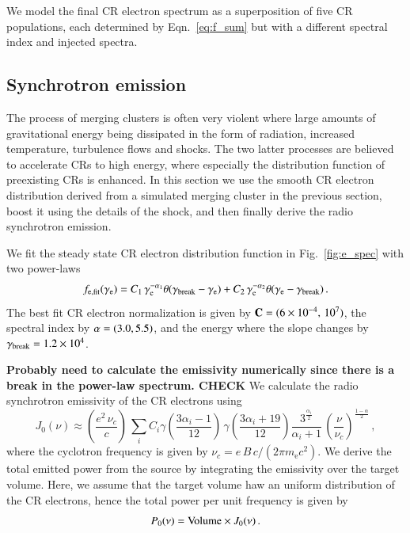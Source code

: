 \documentclass[useAMS,usenatbib]{mn2e}
\def\C#1{{\bf #1}}
\newcommand{\e}{\mathrm{e}}
\newcommand{\mecc}{m_\e c^2}
\newcommand{\gam}{\gamma}
\begin{document}
We model the final CR electron spectrum as a superposition of five CR
populations, each determined by Eqn.~\ref{eq:f_sum} but with a
different spectral index and injected spectra. 


\subsection{Synchrotron emission}
The process of merging clusters is often very violent where large
amounts of gravitational energy being dissipated in the form of
radiation, increased temperature, turbulence flows and shocks. The two
latter processes are believed to accelerate CRs to high energy, where
especially the distribution function of preexisting CRs is
enhanced. In this section we use the smooth CR electron distribution
derived from a simulated merging cluster in the previous section,
boost it using the details of the shock, and then finally derive the
radio synchrotron emission.

We fit the steady state CR electron distribution function in
Fig.~\ref{fig:e_spec} with two power-laws
\begin{equation}
  f_\rmn{e,fit}(\gam_\e) = C_1\,\gam_\e^{-\alpha_1}
\theta(\gam_\rmn{break}-\gam_\e) 
+ C_2\,\gam_\e^{-\alpha_2}
\theta(\gam_\e-\gam_\rmn{break})\,. 
\label{eq:f_fit}
\end{equation}
The best fit CR electron normalization is given by ${\bf
  C}=(6\times10^{-4},\,10^{7})$, the spectral index by ${\bf
  \alpha}=(3.0,5.5)$, and the energy where the slope changes by
$\gam_\rmn{break}=1.2\times10^4$.

\C{Probably need to calculate the emissivity numerically since there
  is a break in the power-law spectrum. CHECK} We calculate the radio
synchrotron emissivity of the CR electrons using \cite{1979rpa..book.....R}
\begin{equation}
J_0(\nu) \approx \left(\frac{e^2\,\nu_c}{c}\right)\,\sum_i C_i
\gam\left(\frac{3 \alpha_i-1}{12}\right)\,\gam\left(\frac{3 \alpha_i+19}{12}\right)\frac{3^\frac{\alpha_i}{2}}{\alpha_i+1}\,\left(\frac{\nu}{\nu_c}\right)^{\frac{1-\alpha}{2}}\,,
\end{equation}
where the cyclotron frequency is given by
$\nu_c=e\,B\,c/(2\pi\mecc)$. We derive the total emitted power from
the source by integrating the emissivity over the target volume. Here,
we assume that the target volume haw an uniform distribution of the
CR electrons, hence the total power per unit frequency is given by
\begin{equation}
  P_0(\nu) = {\mathrm{Volume}} \times J_0(\nu)\,.
\end{equation}
\end{document}
